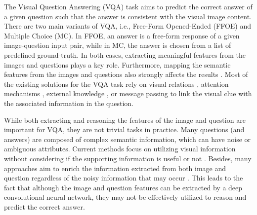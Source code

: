 \documentclass[10pt,twocolumn,letterpaper]{article}
\begin{document}
The Visual Question Answering (VQA) task aims to predict the correct answer of a given question such that the answer is consistent with the visual image content.
There are two main variants of VQA, i.e., Free-Form Opened-Ended (FFOE) and Multiple Choice (MC). In FFOE, an answer is a free-form response of a given image-question input pair, while in MC, the answer is chosen from a list of predefined ground-truth. In both cases, extracting meaningful features from the images and questions plays a key role.
Furthermore, mapping the semantic features from the images and questions also strongly affects the results \cite{gordon2018iqa}. Most of the existing solutions for the VQA task rely on visual relations \cite{chen2019routingGraph,cadene2019murel,zhang2020multimodal,yang2020trrnet}, attention mechanisms \cite{teney2017graphvqa,tan2019lxmert, Kim2018BilinearAN}, external knowledge \cite{gu2019externalGraph,li2019perceptual}, or message passing \cite{teney2017graphvqa} to link the visual clue with the associated information in the question. 


While both extracting and reasoning the features of the image and question are important for VQA, they are not trivial tasks in practice. Many questions (and answers) are composed of complex semantic information, which can have noise or ambiguous attributes. Current methods focus on utilizing  visual information \cite{chen2019routingGraph,liang2017deepAttGraph,Hudson2019LearningBA,lu2018r,nguyen2021graph,Wang2017FVQAFV,nguyen2020autonomous,narasimhan2018outofboxVQA,Marino2019OKVQAAV} without considering if the supporting information is useful or not \cite{gordon2018iqa}. Besides, many approaches aim to enrich the information extracted from both image and question regardless of the noisy information that may occur \cite{gu2019externalGraph,chen2019routingGraph,gao2020multi,gao2019DFAF}. This leads to the fact that although the image and question features can be extracted by a deep convolutional neural network, they may not be effectively utilized to reason and predict the correct answer.  
\end{document}
